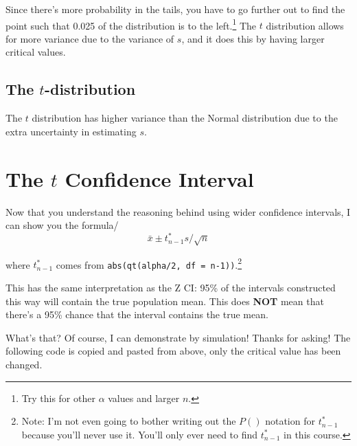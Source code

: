 \documentclass[
  letterpaper,
  DIV=11,
  numbers=noendperiod,
  oneside]{scrreprt}
\begin{document}
Since there's more probability in the tails, you have to go further out
to find the point such that 0.025 of the distribution is to the
left.\footnote{Try this for other \(\alpha\) values and larger \(n\).}
The \(t\) distribution allows for more variance due to the variance of
\(s\), and it does this by having larger critical values.

\hypertarget{the-t-distribution-1}{%
\subsection{\texorpdfstring{The
\(t\)-distribution}{The t-distribution}}\label{the-t-distribution-1}}

The \(t\) distribution has higher variance than the Normal distribution
due to the extra uncertainty in estimating \(s\).

\hypertarget{the-t-confidence-interval}{%
\section{\texorpdfstring{The \(t\) Confidence
Interval}{The t Confidence Interval}}\label{the-t-confidence-interval}}

Now that you understand the reasoning behind using wider confidence
intervals, I can show you the formula/ \[
\bar x \pm t_{n-1}^*s/\sqrt{n}
\]

where \(t^*_{n-1}\) comes from
\texttt{abs(qt(alpha/2,\ df\ =\ n-1))}.\footnote{Note: I'm not even
  going to bother writing out the \(P()\) notation for \(t^*_{n-1}\)
  because you'll never use it. You'll only ever need to find
  \(t^*_{n-1}\) in this course.}

This has the same interpretation as the Z CI: 95\% of the intervals
constructed this way will contain the true population mean. This does
\textbf{NOT} mean that there's a 95\% chance that the interval contains
the true mean.

What's that? Of course, I can demonstrate by simulation! Thanks for
asking! The following code is copied and pasted from above, only the
critical value has been changed.
\end{document}

